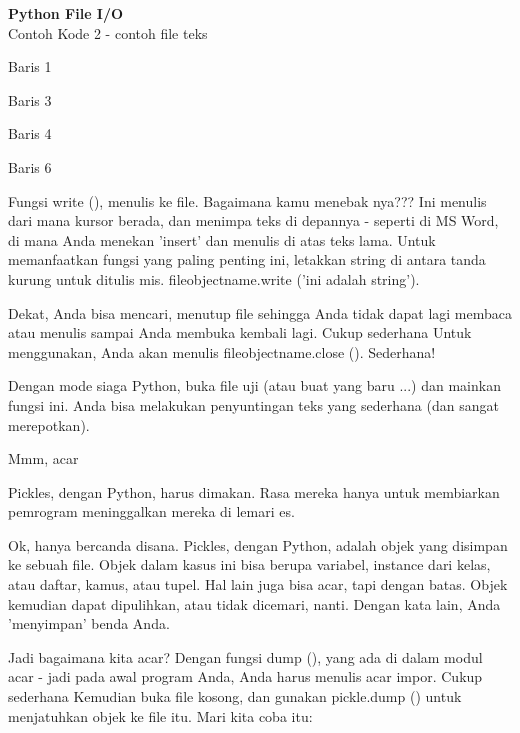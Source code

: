 \begin{center}{\fontsize{24pt}{24pt}\selectfont \textbf{Python File I/O} \\}
Contoh Kode 2 - contoh file teks 

\vspace{12pt}
 
Baris 1 

\vspace{12pt}

Baris 3

Baris 4 

\vspace{12pt}

Baris 6 
\vspace{14pt}

Fungsi write (), menulis ke file. Bagaimana kamu menebak nya??? Ini menulis dari mana kursor berada, dan menimpa teks di depannya - seperti di MS Word, di mana Anda menekan 'insert' dan menulis di atas teks lama. Untuk memanfaatkan fungsi yang paling penting ini, letakkan string di antara tanda kurung untuk ditulis mis. fileobjectname.write ('ini adalah string'). 

\vspace{12pt}

Dekat, Anda bisa mencari, menutup file sehingga Anda tidak dapat lagi membaca atau menulis sampai Anda membuka kembali lagi. Cukup sederhana Untuk menggunakan, Anda akan menulis fileobjectname.close (). Sederhana! 

\vspace{12pt}

Dengan mode siaga Python, buka file uji (atau buat yang baru ...) dan mainkan fungsi ini. Anda bisa melakukan penyuntingan teks yang sederhana (dan sangat merepotkan). 

Mmm, acar 

\vspace{12pt}
 
Pickles, dengan Python, harus dimakan. Rasa mereka hanya untuk membiarkan pemrogram meninggalkan mereka di lemari es. 

\vspace{12pt}
 
Ok, hanya bercanda disana. Pickles, dengan Python, adalah objek yang disimpan ke sebuah file. Objek dalam kasus ini bisa berupa variabel, instance dari kelas, atau daftar, kamus, atau tupel. Hal lain juga bisa acar, tapi dengan batas. Objek kemudian dapat dipulihkan, atau tidak dicemari, nanti. Dengan kata lain, Anda 'menyimpan' benda Anda. 

\vspace{12pt}
 
Jadi bagaimana kita acar? Dengan fungsi dump (), yang ada di dalam modul acar - jadi pada awal program Anda, Anda harus menulis acar impor. Cukup sederhana Kemudian buka file kosong, dan gunakan pickle.dump () untuk menjatuhkan objek ke file itu. Mari kita coba itu: 


\end{center}
